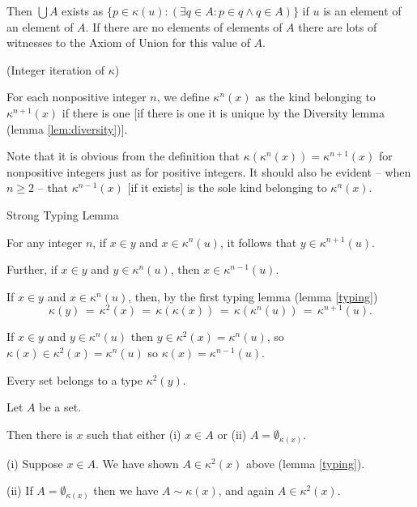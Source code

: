 \documentclass[12pt]{article}
\begin{document}
Then $\bigcup A$ exists as $\{p \in \kappa(u):(\exists q \in A:p \in q \wedge q \in A)\}$ if $u$ is an element of an element of $A$.  If there are no elements of elements of $A$ there are lots of witnesses to the Axiom of Union for this value of $A$.  \endproof


\medskip

\begin{dfn}  (Integer iteration of $\kappa$)

For each nonpositive integer $n$, we define $\kappa^{n}(x)$ as the kind belonging to $\kappa^{n+1}(x)$ if there is one [if there is one it is unique by the Diversity lemma (lemma \ref{lem:diversity})]. \end{dfn} Note that it is obvious from the definition that $\kappa(\kappa^n(x)) = \kappa^{n+1}(x)$ for nonpositive integers just as for positive integers.  It should also be evident -- when $n\geq 2$ -- that $\kappa^{n-1}(x)$ [if it exists] is the sole kind belonging to $\kappa^n(x)$.

\begin{lem} Strong Typing Lemma \label{Strong Typing Lemma}

  
  For any integer $n$, if $x \in y$ and $x \in \kappa^n(u)$, it follows that $y \in \kappa^{n+1}(u)$.

  Further, if $x \in y$ and $y \in \kappa^n(u)$, then $x \in \kappa^{n-1}(u)$.\end{lem}

  \Proof

  If $x \in y$ and $x \in \kappa^n(u)$, then, by the first typing lemma (lemma \ref{typing}) $$\kappa(y)\, =\, \kappa^2(x)\, =\, \kappa(\kappa(x))\, =\, \kappa(\kappa^n(u))\, =\, \kappa^{n+1}(u).$$

If $x \in y$ and $y \in \kappa^n(u)$ then $y \in \kappa^2(x) = \kappa^n(u)$, so $\kappa(x) \in \kappa^2(x) = \kappa^n(u)$ so $\kappa(x) = \kappa^{n-1}(u)$.\endproof

\begin{lem}  Every set belongs to a type $\kappa^2(y)$.\end{lem}

\Proof

Let $A$ be a set.

Then there is $x$ such that either (i) $x \in A$ or (ii) $A = \emptyset_{\kappa(x)}$.

\smallskip

(i) Suppose $x \in A$.  We have shown $A \in \kappa^2(x)$ above (lemma \ref{typing}).

(ii) If $A = \emptyset_{\kappa(x)}$ then we have $A \sim \kappa(x)$, and again $A \in \kappa^2(x)$.
\end{document}
